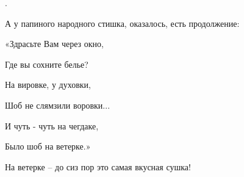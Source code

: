 .

А у папиного народного стишка, оказалось, есть продолжение:

«Здрасьте Вам через окно,

Где вы сохните белье?

На вировке, у духовки,

Шоб не слямзили воровки...

И чуть - чуть на чегдаке,

Было шоб на ветерке.»

На ветерке – до сиз пор это самая вкусная сушка!

